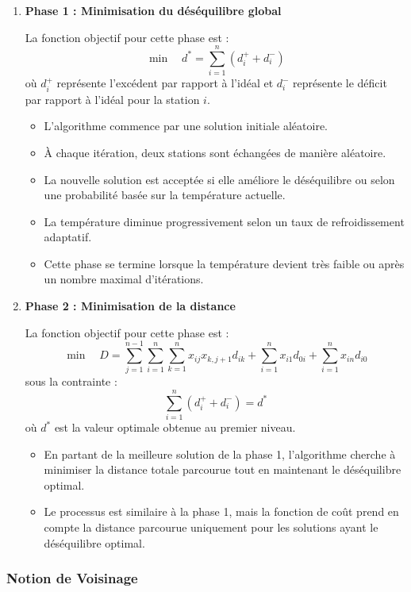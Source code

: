 \documentclass{article}
\begin{document}
\begin{enumerate}
\item \textbf{Phase 1 : Minimisation du déséquilibre global}

  La fonction objectif pour cette phase est :
  \[
  \min \quad d^* = \sum_{i=1}^n (d_i^+ + d_i^-)
  \]
  où $d_i^+$ représente l'excédent par rapport à l'idéal et $d_i^-$ représente le déficit par rapport à l'idéal pour la station $i$.

  \begin{itemize}
    \item L'algorithme commence par une solution initiale aléatoire.
    \item À chaque itération, deux stations sont échangées de manière aléatoire.
    \item La nouvelle solution est acceptée si elle améliore le déséquilibre ou selon une probabilité basée sur la température actuelle.
    \item La température diminue progressivement selon un taux de refroidissement adaptatif.
    \item Cette phase se termine lorsque la température devient très faible ou après un nombre maximal d'itérations.
  \end{itemize}

\item \textbf{Phase 2 : Minimisation de la distance}

  La fonction objectif pour cette phase est :
  \[
  \min \quad D = \sum_{j=1}^{n-1} \sum_{i=1}^n \sum_{k=1}^n x_{ij} x_{k,j+1} d_{ik} + \sum_{i=1}^n x_{i1} d_{0i} + \sum_{i=1}^n x_{in} d_{i0}
  \]
  sous la contrainte :
  \[
  \sum_{i=1}^n (d_i^+ + d_i^-) = d^*
  \]
  où $d^*$ est la valeur optimale obtenue au premier niveau.

  \begin{itemize}
    \item En partant de la meilleure solution de la phase 1, l'algorithme cherche à minimiser la distance totale parcourue tout en maintenant le déséquilibre optimal.
    \item Le processus est similaire à la phase 1, mais la fonction de coût prend en compte la distance parcourue uniquement pour les solutions ayant le déséquilibre optimal.
  \end{itemize}
\end{enumerate}

\subsubsection{Notion de Voisinage}
\end{document}
